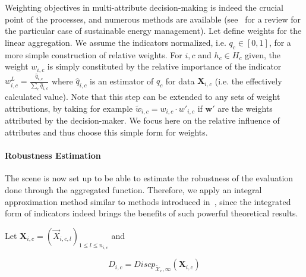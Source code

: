 \documentclass[runningheads,a4paper]{llncs2e/llncs}
\begin{document}
Weighting objectives in multi-attribute decision-making is indeed the crucial point of the processes, and numerous methods are available (see~\cite{wang2009review} for a review for the particular case of sustainable energy management). Let define weights for the linear aggregation. We assume the indicators normalized, i.e. $q_c \in [0,1]$, for a more simple construction of relative weights. For $i,c$ and $h_{c}\in H_{c}$ given, the weight $w_{i,c}$ is simply constituted by the relative importance of the indicator $w_{i,c}^{L}=\frac{\hat{q}_{i,c}}{\sum_{c}\hat{q}_{i,c}}$ where $\hat{q}_{i,c}$ is an estimator of $q_{c}$ for data $\mathbf{X}_{i,c}$ (i.e. the effectively calculated value). Note that this step can be extended to any sets of weight attributions, by taking for example $\tilde{w}_{i,c} = w_{i,c} \cdot w'_{i,c}$ if $\mathbf{w}'$ are the weights attributed by the decision-maker. We focus here on the relative influence of attributes and thus choose this simple form for weights.










\paragraph{Robustness Estimation}

The scene is now set up to be able to estimate the robustness of the evaluation done through the aggregated function. Therefore, we apply an integral approximation method similar to methods introduced in~\cite{varet2010developpement}, since the integrated form of indicators indeed brings the benefits of such powerful theoretical results.

Let $\mathbf{X}_{i,c}=(\vec{X}_{i,c,l})_{1\leq l\leq n_{i,c}}$ and

\[D_{i,c}=Discp_{\tilde{\mathcal{X}}_{c},\infty}(\mathbf{X}_{i,c})\]
\end{document}
